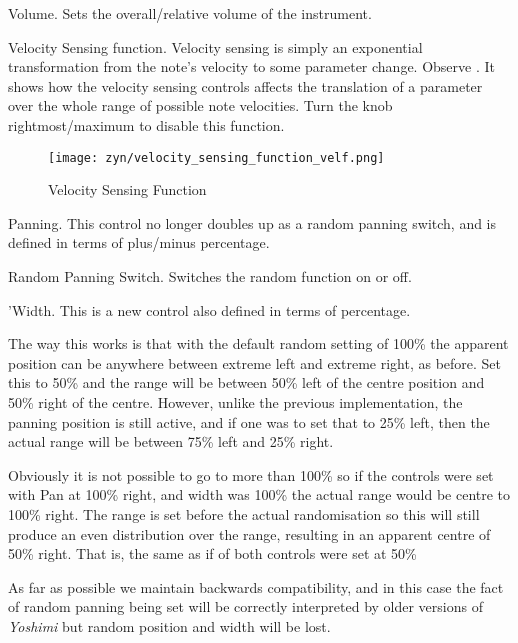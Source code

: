    \setcounter{ItemCounter}{0}
   Volume.
   Sets the overall/relative volume of the instrument.

   Velocity Sensing function.
   Velocity sensing is simply an exponential transformation from the note’s
   velocity to some parameter change.
   Observe .
   It shows how the velocity sensing controls affects the translation of a
   parameter over the whole range of possible note velocities.
   Turn the knob rightmost/maximum to disable this function.

\begin{figure}[H]
   \centering
   \texttt{[image: zyn/velocity\_sensing\_function\_velf.png]}
   \caption{Velocity Sensing Function}
   \label{fig:velocity_sensing_function}
\end{figure}

   Panning.
   This control no longer doubles up as a random panning switch, and is
   defined in terms of plus/minus percentage.

   Random Panning Switch.
   Switches the random function on or off.

   'Width.
   This is a new control also defined in terms of percentage.

   The way this works is that with the default random setting of 100\% the
   apparent position can be anywhere between extreme left and extreme right,
   as before. Set this to 50\% and the range will be between 50\% left of the
   centre position and 50\% right of the centre. However, unlike the previous
   implementation, the panning position is still active, and if one was to set
   that to 25\% left, then the actual range will be between 75\% left and 25\%
   right.

   Obviously it is not possible to go to more than 100\% so if the controls
   were set with Pan at 100\% right, and width was 100\% the actual range
   would be centre to 100\% right. The range is set before the actual
   randomisation so this will still produce an even distribution over the
   range, resulting in an apparent centre of 50\% right. That is, the same as
   if of both controls were set at 50\%

   As far as possible we maintain backwards compatibility, and in this case
   the fact of random panning being set will be correctly interpreted by older
   versions of \textsl{Yoshimi} but random position and width will be lost.

